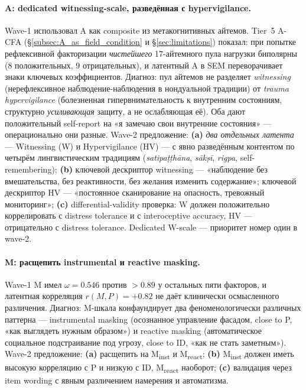 \paragraph{A: dedicated witnessing-scale, разведённая с hypervigilance.} Wave-1 использовал A как composite из метакогнитивных айтемов. Tier~5 A-CFA (§\ref{subsec:A_as_field_condition} и §\ref{sec:limitations}) показал: при попытке рефлексивной факторизации \emph{чистейшего} 17-айтемного пула нагрузки биполярны (8 положительных, 9 отрицательных), и латентный A в SEM переворачивает знаки ключевых коэффициентов. Диагноз: пул айтемов не разделяет \emph{witnessing} (нерефлексивное наблюдение-наблюдения в нондуальной традиции) от \emph{trauma hypervigilance} (болезненная гипервнимательность к внутренним состояниям, структурно \emph{усиливающая} защиту, а не ослабляющая её). Оба дают положительный self-report на «я замечаю свои внутренние состояния» --- операционально они разные. Wave-2 предложение: \textbf{(a)} \emph{два отдельных латента} --- Witnessing (W) и Hypervigilance (HV) --- с явно разведённым контентом по четырём лингвистическим традициям (\emph{satipaṭṭhāna}, \emph{sākṣī}, \emph{rigpa}, self-remembering); \textbf{(b)} ключевой дескриптор witnessing --- «наблюдение без вмешательства, без реактивности, без желания изменить содержание»; ключевой дескриптор HV --- «постоянное сканирование на опасность, тревожный мониторинг»; \textbf{(c)} differential-validity проверка: W должен положительно коррелировать с distress tolerance и с interoceptive accuracy, HV --- отрицательно с distress tolerance. Dedicated W-scale --- приоритет номер один в wave-2.

\paragraph{M: расщепить instrumental и reactive masking.} Wave-1 M имел $\omega = 0.546$ против $> 0.89$ у остальных пяти факторов, и латентная корреляция $r(M, P) = +0.82$ не даёт клинически осмысленного различения. Диагноз: M-шкала конфаундирует два феноменологически различных паттерна --- instrumental masking (осознанное управление фасадом, close to P, «как выглядеть нужным образом») и reactive masking (автоматическое социальное подстраивание под угрозу, close to ID, «как не стать заметным»). Wave-2 предложение: \textbf{(a)} расщепить на M\textsubscript{inst} и M\textsubscript{react}; \textbf{(b)} M\textsubscript{inst} должен иметь высокую корреляцию с P и низкую с ID, M\textsubscript{react} наоборот; \textbf{(c)} валидация через item wording с явным различением намерения и автоматизма.

